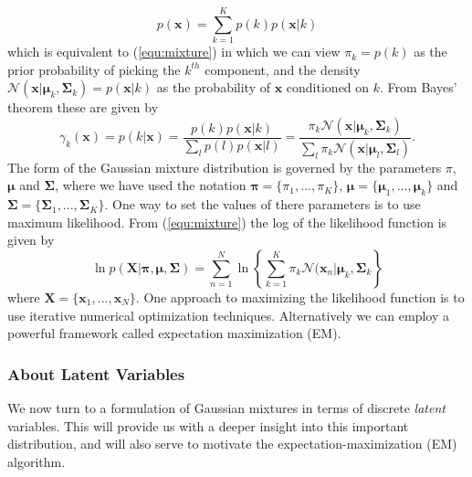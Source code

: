 ﻿\documentclass[a4paper, 11pt]{article}
\numberwithin{equation}{subsection}
\begin{document}
\begin{equation}
p(\mathbf x)=\sum_{k=1}^K p(k)p(\mathbf x|k)
\end{equation}
which is equivalent to (\ref{equ:mixture}) in which we can view $\pi_k=p(k)$ as the prior probability of picking the $k^{th}$ component, and the density $\mathcal N(\mathbf x|\boldsymbol\mu_k,\boldsymbol\Sigma_k)= p(\mathbf x|k)$ as the probability of $\mathbf x$ conditioned on $k$. From Bayes' theorem these are given by
\begin{equation}
\gamma_k(\mathbf x)=p(k|\mathbf x)=\frac{p(k)p(\mathbf x|k)}{\sum_lp(l)p(\mathbf x|l)}=\frac{\pi_k\mathcal N(\mathbf x|\boldsymbol\mu_k,\boldsymbol\Sigma_k)}{\boldsymbol\sum_l\pi_k\mathcal N(\mathbf x|\boldsymbol\mu_l,\boldsymbol\Sigma_l)}.
\end{equation}
The form of the Gaussian mixture distribution is governed by the parameters $\pi$, $\boldsymbol\mu$ and $\boldsymbol\Sigma$, where we have used the notation $\boldsymbol\pi=\{\pi_1,...,\pi_K\}$, $\boldsymbol\mu=\{\boldsymbol\mu_1,...,\boldsymbol\mu_k\}$ and $\boldsymbol\Sigma=\{\boldsymbol\Sigma_1,...,\boldsymbol\Sigma_K\}$. One way to set the values of there parameters is to use maximum likelihood. From (\ref{equ:mixture}) the log of the likelihood function is given by
\begin{equation}
\ln p(\mathbf X|\boldsymbol\pi,\boldsymbol\mu,\boldsymbol\Sigma)=\sum_{n=1}^N\ln\left\{\sum_{k=1}^K\pi_k\mathcal N(\mathbf x_n|\boldsymbol\mu_k,\boldsymbol\Sigma_k\right\}
\end{equation}
where $\mathbf X = \{\mathbf x_1,...,\mathbf x_N\}$. One approach to maximizing the likelihood function is to use iterative numerical optimization techniques. Alternatively we can employ a powerful framework called expectation maximization (EM).

\subsubsection{About Latent Variables}
We now turn to a formulation of Gaussian mixtures in terms of discrete \emph{latent} variables. This will provide us with a deeper insight into this important distribution, and will also serve to motivate the expectation-maximization (EM) algorithm.
\end{document}
